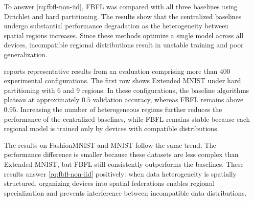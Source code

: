 To answer \ref{rq:fbfl-non-iid}, 
 \gls{FBFL} was compared with all three baselines using Dirichlet and hard partitioning.
%
The results show that the centralized baselines undergo substantial performance
 degradation as the heterogeneity between spatial regions increases.
%
Since these methods optimize a single model across all devices, 
 incompatible regional distributions result in unstable training and poor generalization.

 reports representative results from an
 evaluation comprising more than \(400\) experimental configurations.
%
The first row shows Extended MNIST under hard partitioning 
 with \(6\) and \(9\) regions.
%
In these configurations, 
 the baseline algorithms plateau at approximately \(0.5\) validation accuracy, 
 whereas \gls{FBFL} remains above \(0.95\).
%
Increasing the number of heterogeneous regions further reduces the performance of the centralized baselines, 
 while \gls{FBFL} remains stable because each regional model is trained only by devices with compatible distributions.

The results on FashionMNIST and MNIST follow the same trend.
%
The performance difference is smaller because these datasets are less complex than Extended MNIST, 
 but \gls{FBFL} still consistently outperforms the baselines.
%
These results answer \ref{rq:fbfl-non-iid} positively:
 when data heterogeneity is spatially structured, 
 organizing devices into spatial federations enables regional specialization 
 and prevents interference between incompatible data distributions.

